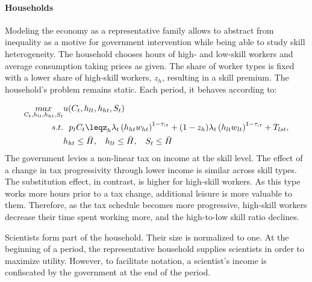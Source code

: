 \paragraph{Households}
Modeling the economy as a representative family allows to abstract from inequality as a motive for government intervention while being able to study skill heterogeneity.
 The household chooses hours of high- and low-skill workers and average consumption taking prices as given. The share of worker types is fixed with a lower share of high-skill workers, $z_h$, resulting in a skill premium. The household's problem remains static. Each period, it behaves according to: %

\begin{align}
\underset{C_{t}, h_{lt}, h_{ht}, S_t}{max}&
u(C_{t}, h_{lt}, h_{ht}, S_t)\\
s.t.& \ \ p_{t}C_{t}\leq%
z_h\lambda_t \left(h_{ht}w_{ht}\right)^{1-\tau_{\iota t}}+(1-z_h)\lambda_t\left(h_{lt}w_{lt}\right)^{1-\tau_{\iota t}}+T_{lst},\\
\ & h_{ht}\leq \bar{H},\ \hspace{2mm} h_{lt}\leq \bar{H},\ \hspace{2mm}  S_{t}\leq \bar{H}
\end{align}
The government levies a non-linear tax on income at the skill level. 
The effect of a change in tax progressivity through lower income is similar across skill types. The substitution effect, in contrast, is higher for high-skill workers. As this type works more hours prior to a tax change, additional leisure is more valuable to them. Therefore, as the tax schedule becomes more progressive, high-skill workers decrease their time spent working more, and the high-to-low skill ratio declines. 

Scientists form part of the household. Their size is normalized to one. At the beginning of a period,  the representative household supplies scientists in order to maximize utility. However, to facilitate notation, a  scientist's income is confiscated by the government at the end of the period. %

